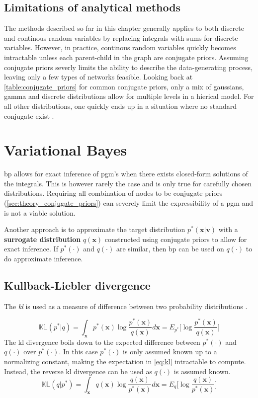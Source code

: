 \subsection{Limitations of analytical methods}
The methods described so far in this chapter generally applies to both discrete and continous random variables by replacing integrals with sums for discrete variables. However, in practice, continous random variables quickly becomes intractable unless each parent-child in the graph are conjugate priors. Assuming conjugate priors severly limits the ability to describe the data-generating process, leaving only a few types of networks feasible. Looking back at \cref{table:conjugate_priors} for common conjugate priors, only a mix of gaussians, gamma and discrete distributions allow for multiple levels in a hierical model. For all other distributions, one quickly ends up in a situation where no standard conjugate exist \cite{winnbishop}. 
\section{Variational Bayes}
\acrshort{bp} allows for exact inference of \acrshort{pgm}'s when there exists closed-form solutions of the integrals. This is however rarely the case and is only true for carefully chosen distributions. Requiring all combination of nodes to be conjugate priors (\cref{sec:theory_conjugate_priors}) can severely limit the expressibility of a \acrshort{pgm} and is not a viable solution. 

Another approach is to approximate the target distribution $p^*(\mathbf{x} | \mathbf{v})$ with a \textbf{surrogate distribution} $q(\mathbf{x})$ constructed using conjugate priors to allow for exact inference. If $p^*(\cdot)$ and $q(\cdot)$ are similar, then \acrshort{bp} can be used on $q(\cdot)$ to do approximate inference.

\subsection{Kullback-Liebler divergence}
The \textit{\acrfull{kl}}  is used as a measure of difference between two probability distributions \cite{kullback1951,murphy}.

\begin{equation}\label{eq:kl}
    \mathbb{KL}(p^* | q) = \int_\mathbf{x} p^*(\mathbf{x}) \log \frac{p^*(\mathbf{x})}{q(\mathbf{x})} d\mathbf{x} = E_{p^*} \big[ \log \frac{p^*(\mathbf{x})}{q(\mathbf{x})} \big]
\end{equation}
The \acrshort{kl} divergence boils down to the expected difference between $p^*(\cdot)$ and $q(\cdot)$ over $p^*(\cdot)$.
In this case $p^*(\cdot)$ is only assumed known up to a normalizing constant, making the expectation in \cref{eq:kl} intractable to compute. Instead, the reverse \acrshort{kl} divergence can be used as $q(\cdot)$ is assumed known.
\begin{equation}\label{eq:reverse_kl}
    \mathbb{KL}(q | p^*) = \int_\mathbf{x} q(\mathbf{x}) \log \frac{q(\mathbf{x})}{p^*(\mathbf{x})} d\mathbf{x} = E_{q} \big[ \log \frac{q(\mathbf{x})}{p^*(\mathbf{x})} \big]
\end{equation}

